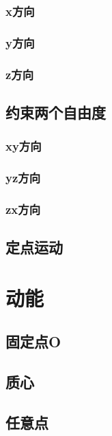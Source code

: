 \subsubsection{x方向}
\subsubsection{y方向}
\subsubsection{z方向}
\subsection{约束两个自由度}
\subsubsection{xy方向}
\subsubsection{yz方向}
\subsubsection{zx方向}
\subsection{定点运动}
\section{动能}

\subsection{固定点O}
\subsection{质心}
\subsection{任意点}